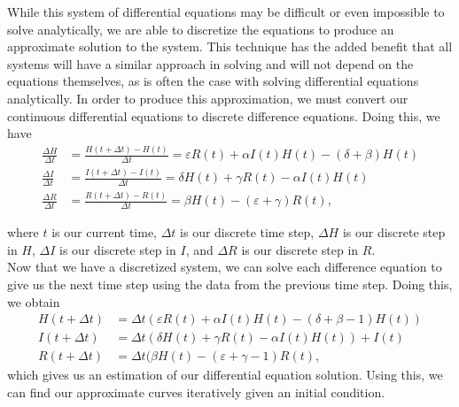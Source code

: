 \documentclass[11pt]{article}
\begin{document}
While this system of differential equations may be difficult or even impossible to solve analytically, we are able to discretize the equations to produce an approximate solution to the system.
This technique has the added benefit that all systems will have a similar approach in solving and will not depend on the equations themselves, as is often the case with solving differential equations analytically.
In order to produce this approximation, we must convert our continuous differential equations to discrete difference equations.  
Doing this, we have
\begin{align*}
    \frac{\Delta H}{\Delta t} & = \frac{H(t + \Delta t) - H(t)}{\Delta t} = \varepsilon R(t) + \alpha I(t) H(t) - (\delta + \beta) H(t) \\%
    \frac{\Delta I}{\Delta t} & = \frac{I(t + \Delta t) - I(t)}{\Delta t} = \delta H(t) + \gamma R(t) - \alpha I(t) H(t) \\
    \frac{\Delta R}{\Delta t} & = \frac{R(t + \Delta t) - R(t)}{\Delta t} = \beta H(t) - (\varepsilon + \gamma)R(t),    
\end{align*}


where $t$ is our current time, $\Delta t$ is our discrete time step, $\Delta H$ is our discrete step in $H$, $\Delta I$ is our discrete step in $I$, and $\Delta R$ is our discrete step in $R$. \\

Now that we have a discretized system, we can solve each difference equation to give us the next time step using the data from the previous time step.  Doing this, we obtain
\label{change-eqs}
\begin{align*}
    H(t + \Delta t) & = \Delta t(\varepsilon R(t) + \alpha I(t) H(t) - (\delta + \beta - 1) H(t)) \\ %
    I(t + \Delta t) & = \Delta t(\delta H(t) + \gamma R(t) - \alpha I(t) H(t)) + I(t) \\
    R(t + \Delta t) & = \Delta t(\beta H(t) - (\varepsilon + \gamma - 1) R(t), 
\end{align*}
which gives us an estimation of our differential equation solution.  Using this, we can find our approximate curves iteratively given an initial condition.
\end{document}
